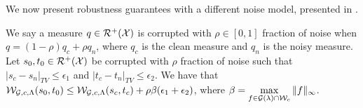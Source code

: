 We now present robustness guarantees with a different noise model, presented in \cite{ROT}.
\begin{corollaryBox}
\begin{corollary}
We say a measure $q\in\mathcal{R}^+(\mathcal{X})$ is corrupted with $\rho\in [0, 1]$ fraction of noise when $q=(1-\rho)q_c+\rho q_n$, where $q_c$ is the clean measure and $q_n$ is the noisy measure.\newline
Let $s_0, t_0\in \mathcal{R}^+(\mathcal{X})$ be corrupted with $\rho$ fraction of noise such that $|s_c-s_n|_{TV}\leq \epsilon_1$ and $|t_c-t_n|_{TV}\leq \epsilon_2$. We have that $\mathcal{W}_{\mathcal{G}, c, \Lambda}(s_0, t_0)\leq  \mathcal{W}_{\mathcal{G}, c, \Lambda}(s_c, t_c)+\rho\beta(\epsilon_1+\epsilon_2)$, where $\beta=\max\limits_{f\in \mathcal{G}(\lambda)\cap \mathcal{W}_c}\|f\|_{\infty}$.
\end{corollary}
\end{corollaryBox}


